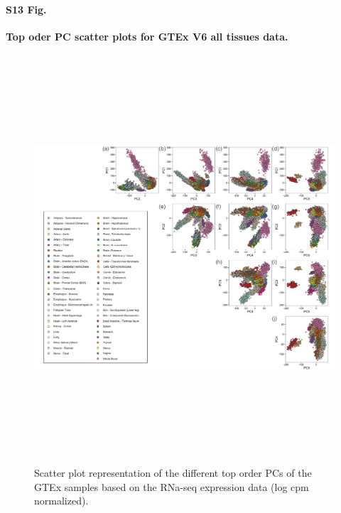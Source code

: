 \documentclass[10pt,letterpaper]{article}
\begin{document}
\paragraph*{S13 Fig.}

\label{figS13}
{\bf Top oder PC scatter plots for GTEx V6 all tissues data.}
\begin{figure}[ht]
\centering
\includegraphics[height=6in, width=6in]{../../plots/gtex-figures/gtex-high-pcs.pdf}
\caption{Scatter plot representation of the different top order PCs of the GTEx samples based on the RNa-seq expression data (log cpm normalized).}
\end{figure}
\end{document}
